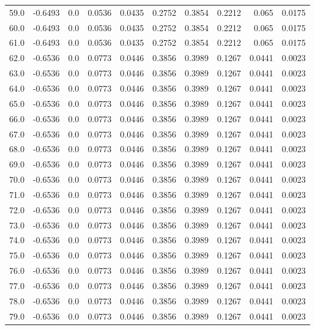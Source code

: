 \begin{longtable}{lrrrrrrrrr}
59.0 & -0.6493 & 0.0 & 0.0536 & 0.0435 & 0.2752 & 0.3854 & 0.2212 & 0.065 & 0.0175 \\
60.0 & -0.6493 & 0.0 & 0.0536 & 0.0435 & 0.2752 & 0.3854 & 0.2212 & 0.065 & 0.0175 \\
61.0 & -0.6493 & 0.0 & 0.0536 & 0.0435 & 0.2752 & 0.3854 & 0.2212 & 0.065 & 0.0175 \\
62.0 & -0.6536 & 0.0 & 0.0773 & 0.0446 & 0.3856 & 0.3989 & 0.1267 & 0.0441 & 0.0023 \\
63.0 & -0.6536 & 0.0 & 0.0773 & 0.0446 & 0.3856 & 0.3989 & 0.1267 & 0.0441 & 0.0023 \\
64.0 & -0.6536 & 0.0 & 0.0773 & 0.0446 & 0.3856 & 0.3989 & 0.1267 & 0.0441 & 0.0023 \\
65.0 & -0.6536 & 0.0 & 0.0773 & 0.0446 & 0.3856 & 0.3989 & 0.1267 & 0.0441 & 0.0023 \\
66.0 & -0.6536 & 0.0 & 0.0773 & 0.0446 & 0.3856 & 0.3989 & 0.1267 & 0.0441 & 0.0023 \\
67.0 & -0.6536 & 0.0 & 0.0773 & 0.0446 & 0.3856 & 0.3989 & 0.1267 & 0.0441 & 0.0023 \\
68.0 & -0.6536 & 0.0 & 0.0773 & 0.0446 & 0.3856 & 0.3989 & 0.1267 & 0.0441 & 0.0023 \\
69.0 & -0.6536 & 0.0 & 0.0773 & 0.0446 & 0.3856 & 0.3989 & 0.1267 & 0.0441 & 0.0023 \\
70.0 & -0.6536 & 0.0 & 0.0773 & 0.0446 & 0.3856 & 0.3989 & 0.1267 & 0.0441 & 0.0023 \\
71.0 & -0.6536 & 0.0 & 0.0773 & 0.0446 & 0.3856 & 0.3989 & 0.1267 & 0.0441 & 0.0023 \\
72.0 & -0.6536 & 0.0 & 0.0773 & 0.0446 & 0.3856 & 0.3989 & 0.1267 & 0.0441 & 0.0023 \\
73.0 & -0.6536 & 0.0 & 0.0773 & 0.0446 & 0.3856 & 0.3989 & 0.1267 & 0.0441 & 0.0023 \\
74.0 & -0.6536 & 0.0 & 0.0773 & 0.0446 & 0.3856 & 0.3989 & 0.1267 & 0.0441 & 0.0023 \\
75.0 & -0.6536 & 0.0 & 0.0773 & 0.0446 & 0.3856 & 0.3989 & 0.1267 & 0.0441 & 0.0023 \\
76.0 & -0.6536 & 0.0 & 0.0773 & 0.0446 & 0.3856 & 0.3989 & 0.1267 & 0.0441 & 0.0023 \\
77.0 & -0.6536 & 0.0 & 0.0773 & 0.0446 & 0.3856 & 0.3989 & 0.1267 & 0.0441 & 0.0023 \\
78.0 & -0.6536 & 0.0 & 0.0773 & 0.0446 & 0.3856 & 0.3989 & 0.1267 & 0.0441 & 0.0023 \\
79.0 & -0.6536 & 0.0 & 0.0773 & 0.0446 & 0.3856 & 0.3989 & 0.1267 & 0.0441 & 0.0023 \\

\end{longtable}

